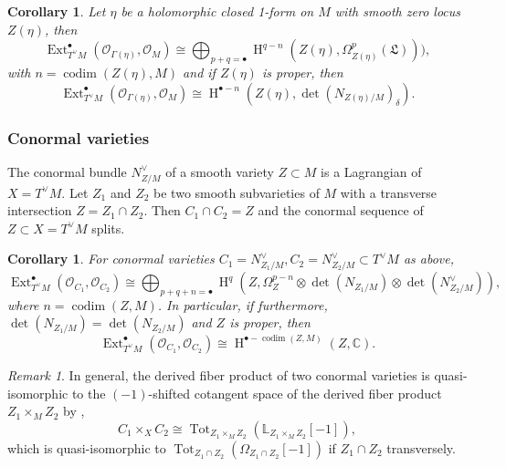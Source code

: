 \documentclass[12pt]{amsart}
\newtheorem{corollary}[theorem]{Corollary}
\theoremstyle{definition}
\newtheorem{examples}[theorem]{Examples}
\theoremstyle{remark}
\newtheorem{remark}[theorem]{Remark}
\numberwithin{equation}{section}
\newcommand{\CC}{\mathbb{C}}
\newcommand{\LL}{\mathbb{L}}
\newcommand{\shO}{\mathcal{O}}
\newcommand{\codim}{\operatorname{codim}}
\newcommand{\Ext}{\operatorname{Ext}}
\newcommand{\Tot}{\operatorname{Tot}}
\newcommand{\arw}{\longrightarrow}
\newcommand{\Hdot}{\operatorname{H}}
\begin{document}
\begin{corollary}\label{cor:graph}
    Let $\eta$ be a holomorphic closed 1-form on $M$ with smooth zero locus $Z(\eta)$, then 
    $$\Ext_{T^{\vee}M}^{\bullet}(\shO_{\Gamma(\eta)}, \shO_M)\cong \bigoplus_{p+q=\bullet} \Hdot^{q-n}(Z(\eta), \Omega_{Z(\eta)}^p(\mathfrak{L}))),$$
    with $n=\codim(Z(\eta), M)$ and if $Z(\eta)$ is proper, then 
    $$\Ext_{T^{\vee}M}^{\bullet}(\shO_{\Gamma(\eta)}, \shO_M)\cong \Hdot^{\bullet-n}(Z(\eta), \det(N_{Z(\eta)/M})_{\delta}).$$
\end{corollary}
\subsubsection{Conormal varieties}
The conormal bundle $N_{Z/M}^{\vee}$ of a smooth variety $Z\subset M$ is a Lagrangian of $X=T^{\vee}M$. Let $Z_1$ and $Z_2$ be two smooth subvarieties of $M$ with a transverse intersection $Z=Z_1\cap Z_2$. Then $C_1\cap C_2=Z$ and the conormal sequence of $Z\subset X=T^{\vee} M$ splits. 
\begin{corollary}\label{cor: ConormalLag}
For conormal varieties $C_1=N_{Z_1/M}^{\vee}, C_2=N_{Z_2/M}^{\vee}\subset T^{\vee} M$ as above, 
    $$ \Ext^{\bullet}_{T^{\vee}M}(\shO_{C_1}, \shO_{C_2})\cong\bigoplus_{p+q+n=\bullet}
\Hdot^q(Z, \Omega_{Z}^{p-n}\otimes \det(N_{Z_1/M})\otimes \det(N_{Z_2/M}^{\vee})),$$
where $n=\codim (Z, M)$. In particular, if furthermore, $\det(N_{Z_1/M})=\det(N_{Z_2/M})$ and $Z$ is proper, then 
  $$ \Ext^{\bullet}_{T^{\vee}M}(\shO_{C_1}, \shO_{C_2})\cong \Hdot^{\bullet-\codim(Z, M)}(Z, \CC).$$
\end{corollary}
\begin{remark}
    In general, the derived fiber product of two conormal varieties is quasi-isomorphic to the $(-1)$-shifted cotangent space of the derived fiber product $Z_1\times_M Z_2$ by \cite{calaque2019shifted},
    $$C_1\times_X C_2\cong \Tot_{Z_1\times_M Z_2}(\LL_{Z_1\times_M Z_2}[-1]),$$
    which is quasi-isomorphic to $\Tot_{Z_1\cap Z_2}(\Omega_{Z_1\cap Z_2}[-1])$ if $Z_1\cap Z_2$ transversely. 
\end{remark}

%
%
%
%
\end{document}
